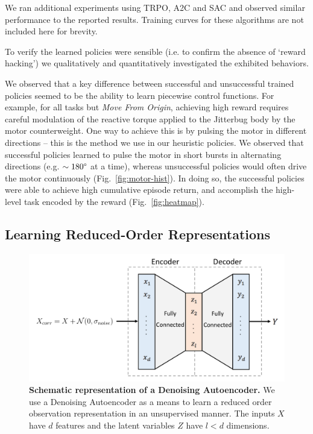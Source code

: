 \documentclass[letterpaper, 10 pt, conference]{ieeeconf}
\begin{document}
We ran additional experiments using TRPO, A2C and SAC and observed similar performance to the reported results.
Training curves for these algorithms are not included here for brevity.

To verify the learned policies were sensible (i.e. to confirm the absence of `reward hacking') we qualitatively and quantitatively investigated the exhibited behaviors.

We observed that a key difference between successful and unsuccessful trained policies seemed to be the ability to learn piecewise control functions.
For example, for all tasks but \emph{Move From Origin}, achieving high reward requires careful modulation of the reactive torque applied to the Jitterbug body by the motor counterweight.
One way to achieve this is by pulsing the motor in different directions -- this is the method we use in our heuristic policies.
We observed that successful policies learned to pulse the motor in short bursts in alternating directions (e.g. $\sim180\degree$ at a time), whereas unsuccessful policies would often drive the motor continuously (Fig.~\ref{fig:motor-hist}).
In doing so, the successful policies were able to achieve high cumulative episode return, and accomplish the high-level task encoded by the reward (Fig.~\ref{fig:heatmap}).

\subsection{Learning Reduced-Order Representations}\label{sec:lro}

\begin{figure}[t]
    \centering
    \includegraphics[width=\linewidth]{fig-autoencoder}
    \caption{
        \textbf{Schematic representation of a Denoising Autoencoder.}
        We use a Denoising Autoencoder as a means to learn a reduced order observation representation in an unsupervised manner. The inputs $X$ have $d$ features and the latent variables $Z$ have $l<d$ dimensions.
    }
    \label{fig:autoencoder}
    \vspace*{-6pt}
\end{figure}
\end{document}
